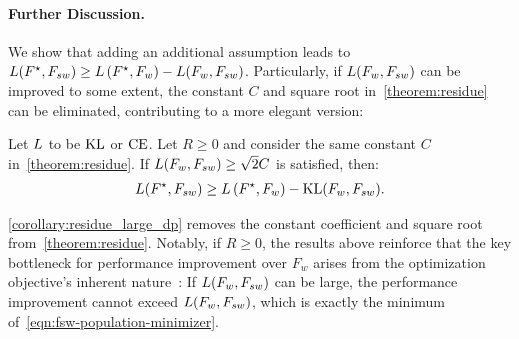 \paragraph{Further Discussion.}
We show that adding an additional assumption leads to $L(F^\star, F_{sw}) \ge L\left( F^\star, F_w \right) - L(F_w, F_{sw})$.
Particularly, if $L(F_w, F_{sw})$ can be improved to some extent, the constant $C$ and square root in~\cref{theorem:residue} can be eliminated, contributing to a more elegant version:
\begin{corollary}\label{corollary:residue_large_dp}
    Let $L$ to be $\mathrm{KL}$ or $\mathrm{CE}$.
    Let $R \ge 0$ and consider the same constant $C$ in~\cref{theorem:residue}.
    If $L(F_w, F_{sw}) \ge \sqrt{2}C$ is satisfied, then: 
    \begin{align*}
        L(F^\star, F_{sw}) \ge L\left( F^\star, F_w \right) - \mathrm{KL}(F_w, F_{sw}).
    \end{align*}
\end{corollary}

\cref{corollary:residue_large_dp} removes the constant coefficient and square root from~\cref{theorem:residue}.
Notably, if $R \ge 0$, the results above reinforce that the key bottleneck for performance improvement over $F_w$ arises from the optimization objective's inherent nature~\citep{yao2025understanding}: 
If $L(F_w, F_{sw})$ can be large, the performance improvement cannot exceed $L(F_w, F_{sw})$, which is exactly the minimum of~\cref{eqn:fsw-population-minimizer}.

